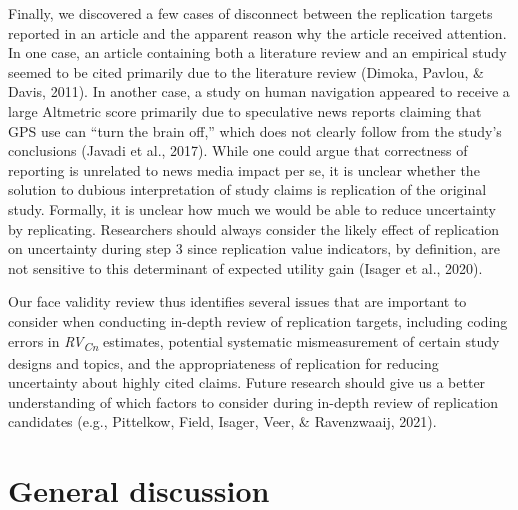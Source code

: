 \documentclass[
  english,
  man,floatsintext]{apa6}
\begin{document}
Finally, we discovered a few cases of disconnect between the replication targets reported in an article and the apparent reason why the article received attention. In one case, an article containing both a literature review and an empirical study seemed to be cited primarily due to the literature review (Dimoka, Pavlou, \& Davis, 2011). In another case, a study on human navigation appeared to receive a large Altmetric score primarily due to speculative news reports claiming that GPS use can ``turn the brain off,'' which does not clearly follow from the study's conclusions (Javadi et al., 2017). While one could argue that correctness of reporting is unrelated to news media impact per se, it is unclear whether the solution to dubious interpretation of study claims is replication of the original study. Formally, it is unclear how much we would be able to reduce uncertainty by replicating. Researchers should always consider the likely effect of replication on uncertainty during step 3 since replication value indicators, by definition, are not sensitive to this determinant of expected utility gain (Isager et al., 2020).

Our face validity review thus identifies several issues that are important to consider when conducting in-depth review of replication targets, including coding errors in \emph{RV\textsubscript{Cn}} estimates, potential systematic mismeasurement of certain study designs and topics, and the appropriateness of replication for reducing uncertainty about highly cited claims. Future research should give us a better understanding of which factors to consider during in-depth review of replication candidates (e.g., Pittelkow, Field, Isager, Veer, \& Ravenzwaaij, 2021).

\hypertarget{general-discussion}{%
\section{General discussion}\label{general-discussion}}
\end{document}
